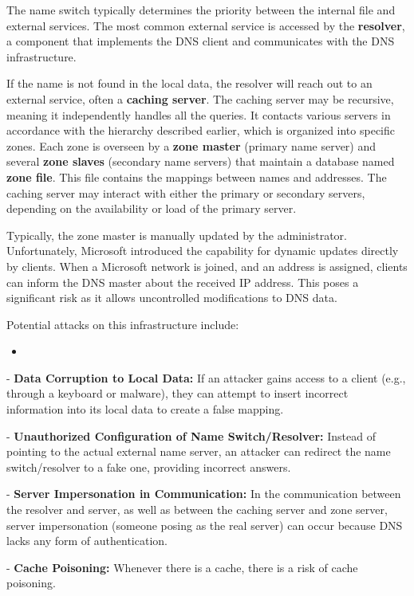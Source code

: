 The name switch typically determines the priority between the internal file and external services. The most common external service is accessed by the \textbf{resolver}, a component that implements the DNS client and communicates with the DNS infrastructure.

If the name is not found in the local data, the resolver will reach out to an external service, often a \textbf{caching server}. The caching server may be recursive, meaning it independently handles all the queries. It contacts various servers in accordance with the hierarchy described earlier, which is organized into specific zones. Each zone is overseen by a \textbf{zone master} (primary name server) and several \textbf{zone slaves} (secondary name servers) that maintain a database named \textbf{zone file}. This file contains the mappings between names and addresses. The caching server may interact with either the primary or secondary servers, depending on the availability or load of the primary server.


Typically, the zone master is manually updated by the administrator. Unfortunately, Microsoft introduced the capability for dynamic updates directly by clients. When a Microsoft network is joined, and an address is assigned, clients can inform the DNS master about the received IP address. This poses a significant risk as it allows uncontrolled modifications to DNS data.

Potential attacks on this infrastructure include:

\begin{itemize}
    \item 
\end{itemize}

- \textbf{Data Corruption to Local Data:} If an attacker gains access to a client (e.g., through a keyboard or malware), they can attempt to insert incorrect information into its local data to create a false mapping.

- \textbf{Unauthorized Configuration of Name Switch/Resolver:} Instead of pointing to the actual external name server, an attacker can redirect the name switch/resolver to a fake one, providing incorrect answers.

- \textbf{Server Impersonation in Communication:} In the communication between the resolver and server, as well as between the caching server and zone server, server impersonation (someone posing as the real server) can occur because DNS lacks any form of authentication.

- \textbf{Cache Poisoning:} Whenever there is a cache, there is a risk of cache poisoning.

